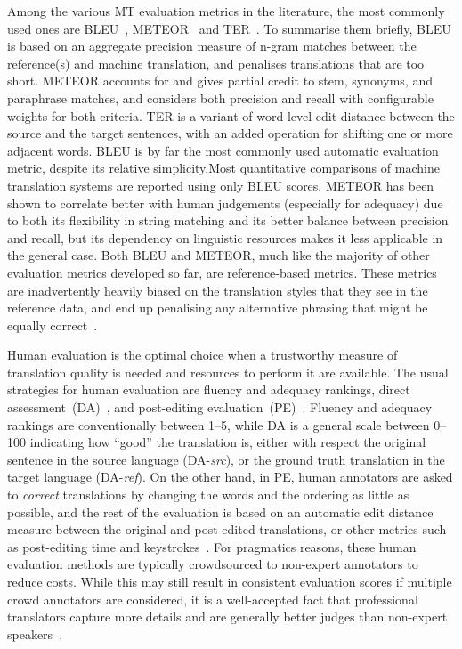 \documentclass{svjour3}
\begin{document}
        Among the various MT evaluation metrics in the literature, the most commonly used ones are  BLEU~\citep{papineni-bleu:-2001}, METEOR~\citep{lavie-meteor:-2007,denkowski-meteor-2014} and TER~\citep{snover-study-2006}. To summarise them briefly, BLEU is based on an aggregate precision measure of n-gram matches between the reference(s) and machine translation, and penalises translations that are too short. METEOR accounts for and gives partial credit to stem, synonyms, and paraphrase matches, and considers both precision and recall with configurable weights for both criteria.  TER is a variant of word-level edit distance between the source and the target sentences, with an added operation for shifting one or more adjacent words. BLEU is by far the most commonly used automatic evaluation metric, despite its relative simplicity.Most quantitative comparisons of machine translation systems are reported using only BLEU scores. METEOR has been shown to correlate better with human judgements (especially for adequacy) due to both its flexibility in string matching and its better balance between precision and recall, but its dependency on linguistic resources makes it less applicable in the general case. Both BLEU and METEOR, much like the majority of other evaluation metrics developed so far, are reference-based metrics. These metrics are inadvertently heavily biased on the translation styles that they see in the reference data, and end up penalising any alternative phrasing that might be equally correct~\citep{fomicheva-specia_ACL:2016}.
        
        Human evaluation is the optimal choice when a trustworthy measure of translation quality is needed and resources to perform it are available. The usual strategies for human evaluation are fluency and adequacy rankings, direct assessment~(DA)~\citep{graham-etal-2013-continuous}, and post-editing evaluation~(PE)~\citep{snover-study-2006}. Fluency and adequacy rankings are conventionally between 1--5, while DA is a general scale between 0--100 indicating how ``good'' the translation is, either with respect the original sentence in the source language (DA-\emph{src}), or the ground truth translation in the target language (DA-\emph{ref}).
On the other hand, in PE, human annotators are asked to \emph{correct} translations by changing the words and the ordering as little as possible, and the rest of the evaluation is based on an automatic edit distance measure between the original and post-edited translations, or other metrics such as post-editing time and keystrokes~\citep{specia-etal_MTSummit:2017}. For pragmatics reasons, these human evaluation methods are typically crowdsourced to non-expert annotators to reduce costs. While this may still result in consistent evaluation scores if multiple crowd annotators are considered, it is a well-accepted fact that professional translators capture more details and are generally better judges than non-expert speakers~\citep{bentivogli-machine-2018}.
        
\end{document}
